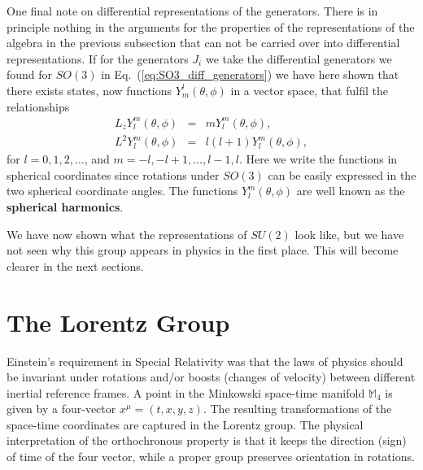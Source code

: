 \documentclass[notes.tex]{subfiles}
\begin{document}
One final note on differential representations of the generators. There is in principle nothing in the arguments for the properties of the representations of the algebra in the previous subsection that can not be carried over into differential representations. If for the generators $J_i$ we take the differential generators we found for $SO(3)$ in Eq.~(\ref{eq:SO3_diff_generators}) we have here shown that there exists states, now functions $Y_m^l(\theta,\phi)$ in a vector space,  that fulfil the relationships
\begin{eqnarray*}
L_z Y_l^m(\theta,\phi) &=& mY_l^m(\theta,\phi), \\
L^2 Y_l^m(\theta,\phi) &=& l(l+1)Y_l^m(\theta,\phi),
\end{eqnarray*}
for $l=0,1,2,\ldots$, and $m=-l,-l+1,\ldots,l-1,l$. Here we write the functions in spherical coordinates since rotations under $SO(3)$ can be easily expressed in the two spherical coordinate angles. The functions $Y_l^m(\theta,\phi)$ are well known as the {\bf spherical harmonics}.

We have now shown what the representations of $SU(2)$ look like, but we have not seen why this group appears in physics in the first place. This will become clearer in the next sections.



\section{The Lorentz Group}
Einstein's requirement in Special Relativity was that the laws of physics should be invariant under rotations and/or boosts (changes of velocity) between different inertial reference frames. A point in the Minkowski space-time manifold $\mathbb{M}_4$ is given by a four-vector $x^\mu = (t,x,y,z)$. The resulting transformations of the space-time coordinates are captured in the Lorentz group.
The physical interpretation of the orthochronous property is that it keeps the direction (sign) of time of the four vector, while a proper group preserves orientation in rotations.
\end{document}
